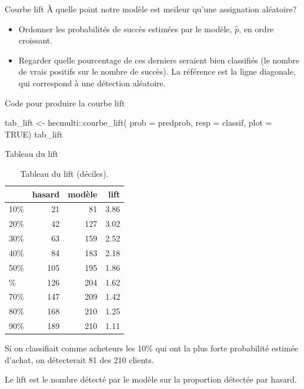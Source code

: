 \documentclass[
  ignorenonframetext,
]{beamer}
\newenvironment{Shaded}{\begin{snugshade}}{\end{snugshade}}
\newcommand{\AttributeTok}[1]{\textcolor[rgb]{0.40,0.45,0.13}{#1}}
\newcommand{\ConstantTok}[1]{\textcolor[rgb]{0.56,0.35,0.01}{#1}}
\newcommand{\FunctionTok}[1]{\textcolor[rgb]{0.28,0.35,0.67}{#1}}
\newcommand{\NormalTok}[1]{\textcolor[rgb]{0.00,0.23,0.31}{#1}}
\newcommand{\OtherTok}[1]{\textcolor[rgb]{0.00,0.23,0.31}{#1}}
\newcommand{\SpecialCharTok}[1]{\textcolor[rgb]{0.37,0.37,0.37}{#1}}
\providecommand{\tightlist}{%
  \setlength{\itemsep}{0pt}\setlength{\parskip}{0pt}}\usepackage{longtable,booktabs,array}
\begin{document}
\begin{frame}{Courbe lift}
\protect\hypertarget{courbe-lift}{}
À quelle point notre modèle est meileur qu'une assignation aléatoire?

\begin{itemize}
\tightlist
\item
  Ordonner les probabilités de succès estimées par le modèle,
  \(\widehat{p}\), en ordre croissant.
\item
  Regarder quelle pourcentage de ces derniers seraient bien classifiés
  (le nombre de vrais positifs sur le nombre de succès). La référence
  est la ligne diagonale, qui correspond à une détection aléatoire.
\end{itemize}
\end{frame}

\begin{frame}[fragile]{Code pour produire la courbe lift}
\protect\hypertarget{code-pour-produire-la-courbe-lift}{}
\begin{Shaded}
\begin{Highlighting}[numbers=left,,]
\NormalTok{tab\_lift }\OtherTok{\textless{}{-}}\NormalTok{ hecmulti}\SpecialCharTok{::}\FunctionTok{courbe\_lift}\NormalTok{(}
  \AttributeTok{prob =}\NormalTok{ predprob,}
  \AttributeTok{resp =}\NormalTok{ classif, }
  \AttributeTok{plot =} \ConstantTok{TRUE}\NormalTok{)}
\NormalTok{tab\_lift}
\end{Highlighting}
\end{Shaded}
\end{frame}

\begin{frame}{Tableau du lift}
\protect\hypertarget{tableau-du-lift}{}
\hypertarget{tbl-lift}{}
\begin{table}
\caption{\label{tbl-lift}Tableau du lift (déciles). }\tabularnewline

\centering
\begin{tabular}{lrrr}
\toprule
  & hasard & modèle & lift\\
\midrule
10\% & 21 & 81 & 3.86\\
20\% & 42 & 127 & 3.02\\
30\% & 63 & 159 & 2.52\\
40\% & 84 & 183 & 2.18\\
50\% & 105 & 195 & 1.86\\
\addlinespace
60\% & 126 & 204 & 1.62\\
70\% & 147 & 209 & 1.42\\
80\% & 168 & 210 & 1.25\\
90\% & 189 & 210 & 1.11\\
\bottomrule
\end{tabular}
\end{table}

\footnotesize

Si on classifiait comme acheteurs les 10\% qui ont la plus forte
probabilité estimée d'achat, on détecterait 81 des 210 clients.

Le lift est le nombre détecté par le modèle sur la proportion détectée
par hasard. \normalsize
\end{frame}
\end{document}
